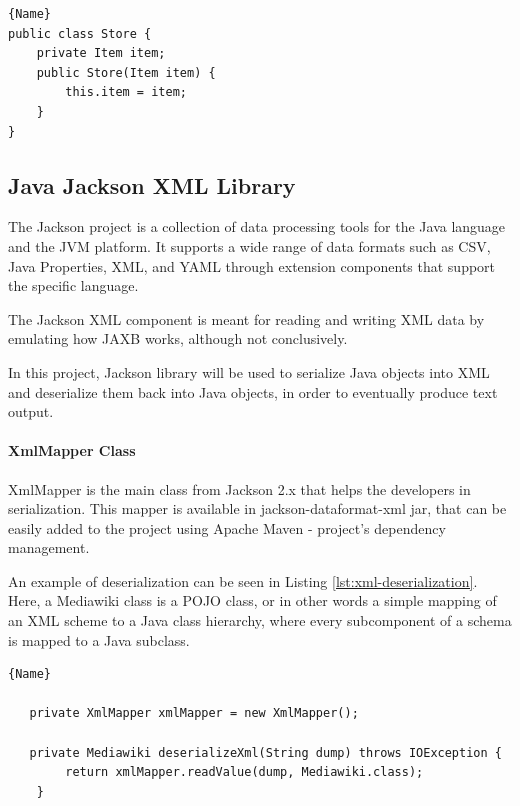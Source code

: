 \documentclass[thesis=M,english,hidelinks]{FITthesis}[2019/12/23]
\begin{document}
\begin{lstlisting}[caption=Example class with a Dependency Injection,frame=tlrb,  label = {lst:with-dep-injection}]{Name}
public class Store {
	private Item item;
	public Store(Item item) {
		this.item = item;
	}
}
\end{lstlisting}

\subsection{Java Jackson XML Library}\label{jackson_library}

The Jackson project is a collection of data processing tools for the Java language and the \gls{JVM} platform. It supports a wide range of data formats such as \gls{CSV}, Java Properties, XML, and \gls{YAML} through extension components that support the specific language.

The Jackson XML component is meant for reading and writing XML data by emulating how \gls{JAXB} works, although not conclusively.

In this project, Jackson library will be used to serialize Java objects into XML and deserialize them back into Java objects, in order to eventually produce text output.

\paragraph{XmlMapper Class} 

XmlMapper is the main class from Jackson 2.x that helps the developers  in serialization. This mapper is available in jackson-dataformat-xml jar, that can be easily added to the project using Apache Maven - project's dependency management\cite{maven_project}.

An example of deserialization can be seen in Listing \ref{lst:xml-deserialization}. Here, a Mediawiki class is a \gls{POJO} class, or in other words a simple mapping of an XML scheme to a Java class hierarchy, where every subcomponent of a schema is mapped to a Java subclass.

\begin{lstlisting}[caption=Example of an XML Deserialization,frame=tlrb,  label = {lst:xml-deserialization}]{Name}
   
   private XmlMapper xmlMapper = new XmlMapper();
   
   private Mediawiki deserializeXml(String dump) throws IOException {
		return xmlMapper.readValue(dump, Mediawiki.class);
	}

\end{lstlisting}
\end{document}

